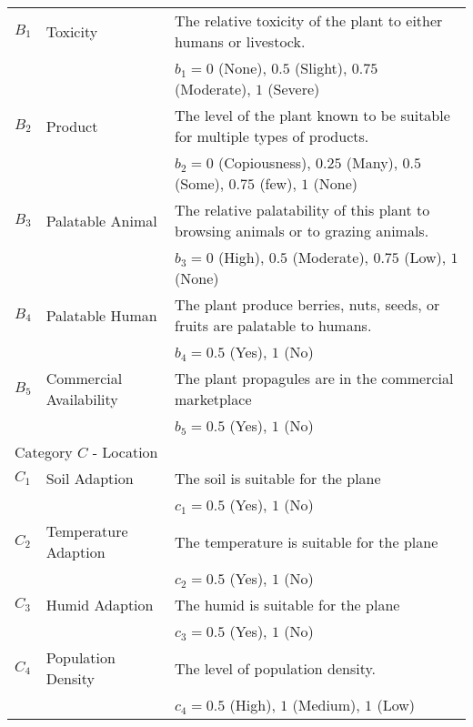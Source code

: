 \documentclass[12pt]{article}
\begin{document}
{{\begin{longtable}{p{0.2in}p{1.5in}p{4.3in}}
	$B_1$ & Toxicity & The relative toxicity of the plant to either humans or livestock.\\
		&& $b_1=0$ (None), $0.5$ (Slight), $0.75$ (Moderate), $1$ (Severe)\\
	$B_2$ & Product & The level of the plant known to be suitable for multiple types of products.\\
		&& $b_2=0$ (Copiousness), $0.25$ (Many), $0.5$ (Some), $0.75$ (few), $1$ (None)\\
	$B_3$ & Palatable Animal & The relative palatability of this plant to browsing animals or to grazing animals.\\
		&& $b_3=0$ (High), $0.5$ (Moderate), $0.75$ (Low), $1$ (None)\\
	$B_4$ & Palatable Human & The plant produce berries, nuts, seeds, or fruits are palatable to humans. \\
		&& $b_4=0.5$ (Yes), $1$ (No)\\
	$B_5$ & Commercial Availability & The plant propagules are in the commercial marketplace \\
		&& $b_5=0.5$ (Yes), $1$ (No)\\

	\midrule
	\multicolumn{3}{l}{Category $C$ - Location}  \\
	\midrule
	
	$C_1$ & Soil Adaption & The soil is suitable for the plane\\
		&& $c_1=0.5$ (Yes), $1$ (No)\\
	$C_2$ & Temperature Adaption & The temperature is suitable for the plane\\
		&& $c_2=0.5$ (Yes), $1$ (No)\\
	$C_3$ & Humid Adaption & The humid is suitable for the plane\\
		&& $c_3=0.5$ (Yes), $1$ (No)\\
	$C_4$ & Population Density & The level of population density.\\
		&& $c_4=0.5$ (High), $1$ (Medium), $1$ (Low)\\

	\bottomrule
	
	\end{longtable}
	}
	}
	
\end{document}
